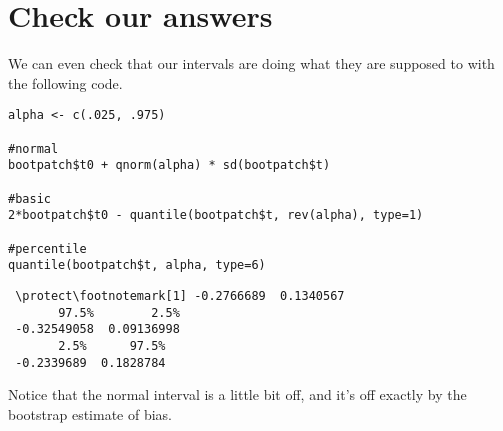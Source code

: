 \documentclass[11pt,english]{article}
\begin{document}
\section*{Check our answers}
\label{sec-3}

We can even check that our intervals are doing what they are supposed to with the following code.


\begin{verbatim}
alpha <- c(.025, .975)

#normal
bootpatch$t0 + qnorm(alpha) * sd(bootpatch$t)

#basic
2*bootpatch$t0 - quantile(bootpatch$t, rev(alpha), type=1)

#percentile
quantile(bootpatch$t, alpha, type=6)
\end{verbatim}




\begin{verbatim}
 \protect\footnotemark[1] -0.2766689  0.1340567
       97.5%        2.5% 
 -0.32549058  0.09136998
       2.5%      97.5% 
 -0.2339689  0.1828784
\end{verbatim}


Notice that the normal interval is a little bit off, and it's off exactly by the bootstrap estimate of bias.
\end{document}
